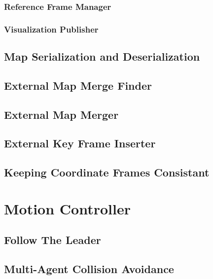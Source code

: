 \subsubsection{Reference Frame Manager}
\label{sec:reference-frame-manager}

\subsubsection{Visualization Publisher}
\label{sec:visualization-publisher}

\subsection{Map Serialization and Deserialization}
\label{sec:map-serialization-and-deserialization}

\subsection{External Map Merge Finder}
\label{sec:external-map-merge-finder}

\subsection{External Map Merger}
\label{sec:external-map-merger}

\subsection{External Key Frame Inserter}
\label{sec:external-key-frame-inserter}

\subsection{Keeping Coordinate Frames Consistant}
\label{sec:keeping-coordinate-frames-consistant}

\section{Motion Controller}
\label{sec:motion-controller}

\subsection{Follow The Leader}
\label{sec:follow-the-leader}

\subsection{Multi-Agent Collision Avoidance}
\label{sec:multi-agent-collision-avoidance}

